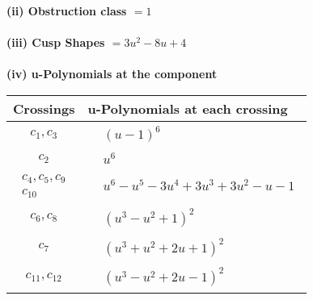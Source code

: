 \documentclass[1p]{elsarticle_modified}
\theoremstyle{definition}
\begin{document}
\flushleft \textbf{(ii) Obstruction class $= 1$}\\~\\
\flushleft \textbf{(iii) Cusp Shapes $= 3 u^2-8 u+4$}\\~\\
\newpage\renewcommand{\arraystretch}{1}
\flushleft \textbf{(iv) u-Polynomials at the component}\newline \\
\begin{tabular}{m{50pt}|m{274pt}}
Crossings & \hspace{64pt}u-Polynomials at each crossing \\
\hline $$\begin{aligned}c_{1},c_{3}\end{aligned}$$&$\begin{aligned}
&(u-1)^6
\end{aligned}$\\
\hline $$\begin{aligned}c_{2}\end{aligned}$$&$\begin{aligned}
&u^6
\end{aligned}$\\
\hline $$\begin{aligned}c_{4},c_{5},c_{9}\\c_{10}\end{aligned}$$&$\begin{aligned}
&u^6- u^5-3 u^4+3 u^3+3 u^2- u-1
\end{aligned}$\\
\hline $$\begin{aligned}c_{6},c_{8}\end{aligned}$$&$\begin{aligned}
&(u^3- u^2+1)^2
\end{aligned}$\\
\hline $$\begin{aligned}c_{7}\end{aligned}$$&$\begin{aligned}
&(u^3+u^2+2 u+1)^2
\end{aligned}$\\
\hline $$\begin{aligned}c_{11},c_{12}\end{aligned}$$&$\begin{aligned}
&(u^3- u^2+2 u-1)^2
\end{aligned}$\\
\hline
\end{tabular}\\~\\
\end{document}
